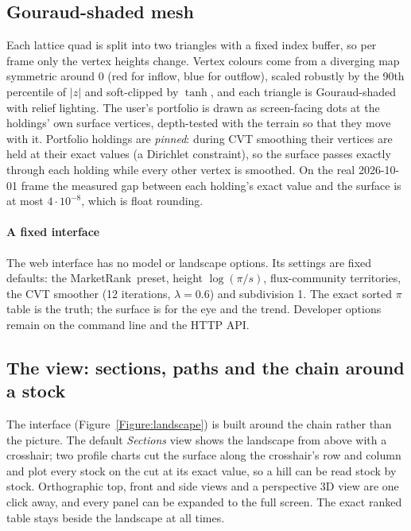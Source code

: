 \documentclass[preprint,3p,twocolumn]{elsarticle}
\newcommand{\MR}{MarketRank}
\begin{document}
\subsection{Gouraud-shaded mesh}
\label{Section:gouraud}
Each lattice quad is split into two triangles with a fixed index buffer, so per frame only the vertex heights change. Vertex colours come from a diverging map symmetric around 0 (red for inflow, blue for outflow), scaled robustly by the 90th percentile of $|z|$ and soft-clipped by $\tanh$, and each triangle is Gouraud-shaded~\cite{gouraud} with relief lighting. The user's portfolio is drawn as screen-facing dots at the holdings' own surface vertices, depth-tested with the terrain so that they move with it. Portfolio holdings are \emph{pinned}: during CVT smoothing their vertices are held at their exact values (a Dirichlet constraint), so the surface passes exactly through each holding while every other vertex is smoothed. On the real 2026-10-01 frame the measured gap between each holding's exact value and the surface is at most $4\cdot10^{-8}$, which is float rounding.

\paragraph{A fixed interface} The web interface has no model or landscape options. Its settings are fixed defaults: the \MR\ preset, height $\log(\pi/s)$, flux-community territories, the CVT smoother (12 iterations, $\lambda=0.6$) and subdivision 1. The exact sorted $\pi$ table is the truth; the surface is for the eye and the trend. Developer options remain on the command line and the HTTP API.

\subsection{The view: sections, paths and the chain around a stock}
\label{Section:view}
The interface (Figure~\ref{Figure:landscape}) is built around the chain rather than the picture. The default \emph{Sections} view shows the landscape from above with a crosshair; two profile charts cut the surface along the crosshair's row and column and plot every stock on the cut at its exact value, so a hill can be read stock by stock. Orthographic top, front and side views and a perspective 3D view are one click away, and every panel can be expanded to the full screen. The exact ranked table stays beside the landscape at all times.
\end{document}

